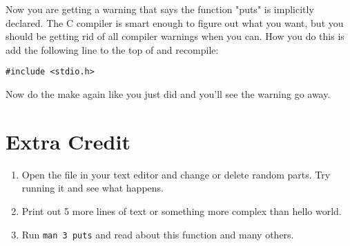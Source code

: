 Now you are getting a warning that says the function "puts" is implicitly declared.
The C compiler is smart enough to figure out what you want, but you should be
getting rid of all compiler warnings when you can.  How you do this is add the
following line to the top of  and recompile:

\begin{lstlisting}
#include <stdio.h>
\end{lstlisting}

Now do the make again like you just did and you'll see the warning go away.

\section{Extra Credit}

\begin{enumerate}
\item Open the  file in your text editor and change or delete random parts.  Try running it and see what happens.
\item Print out 5 more lines of text or something more complex than hello world.
\item Run \verb|man 3 puts| and read about this function and many others.
\end{enumerate}


